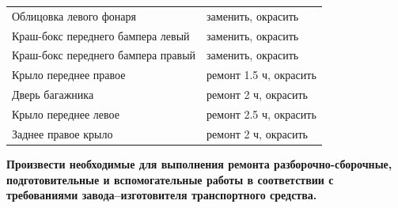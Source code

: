 {\begin{table}[H]
\begin{longtable}{@{}ll@{}}
			Облицовка левого фонаря                  & заменить, окрасить   \\
			Краш-бокс переднего бампера левый        & заменить, окрасить   \\
			Краш-бокс переднего бампера правый       & заменить, окрасить   \\
			Крыло переднее правое                    & ремонт 1.5 ч, окрасить \\
			Дверь багажника                          & ремонт 2 ч, окрасить \\
			Крыло переднее левое                     & ремонт 2.5 ч, окрасить \\
			Заднее правое крыло                      & ремонт 2 ч, окрасить \\ \bottomrule
		\end{longtable}
		
\end{table}}

\renewcommand\baselinestretch{1.2}\small\normalsize
%
\textbf{Произвести  необходимые для выполнения  ремонта разборочно-сборочные, подготовительные и вспомогательные работы в соответствии с требованиями завода–изгото\-ви\-теля транспортного средства.}\\
%
%

%
